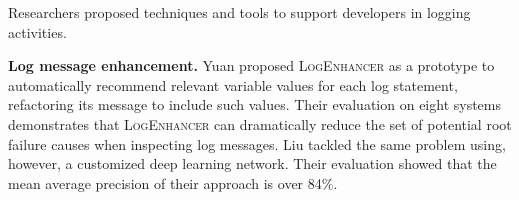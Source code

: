 %
%
%
%
%

Researchers proposed techniques and tools to support developers in logging activities.

\textbf{Log message enhancement.} Yuan \etal \cite{yuan2012improving} proposed \textsc{LogEnhancer} as a prototype to automatically recommend relevant variable values for each log statement, refactoring its message to include such values. Their evaluation on eight systems demonstrates that \textsc{LogEnhancer} can dramatically reduce the set of potential root failure causes when inspecting log messages. Liu \etal \cite{liu2019variables} tackled the same problem using, however, a customized deep learning network. Their evaluation showed that the mean average precision of their approach is over 84\%. \smallskip 

